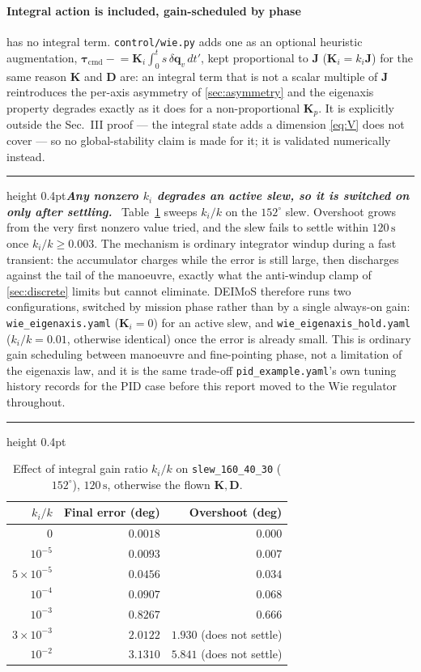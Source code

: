 \documentclass[conference,10pt,a4paper]{IEEEtran}
\newcommand{\remarkrule}{\par\nobreak\vspace{2pt}%
  \hrule height 0.4pt\vspace{4pt}\nobreak}
\newenvironment{keybox}[1][Result]
  {\par\medskip\remarkrule\noindent\small\textbf{\textit{#1.}}\ \ignorespaces}
  {\par\vspace{3pt}\hrule height 0.4pt\par\medskip\ignorespacesafterend}
\newcommand{\vect}[1]{\bm{#1}}
\newcommand{\mat}[1]{\bm{#1}}
\newcommand{\unit}[1]{\ensuremath{\,\mathrm{#1}}}
\begin{document}
\paragraph{Integral action is included, gain-scheduled by phase}
 has no integral term. \texttt{control/wie.py} adds one as an
optional heuristic augmentation,
$\vect{\tau}_\text{cmd}\mathrel{-}=\mat{K}_i\!\int_0^t s\,\delta\vect{q}_v\,dt'$,
kept proportional to $\mat{J}$ ($\mat{K}_i=k_i\mat{J}$) for the same reason
$\mat{K}$ and $\mat{D}$ are: an integral term that is not a scalar multiple of
$\mat{J}$ reintroduces the per-axis asymmetry of \cref{sec:asymmetry} and the
eigenaxis property degrades exactly as it does for a non-proportional
$\mat{K}_p$. It is explicitly outside the Sec.~III
proof --- the integral state adds a dimension \cref{eq:V} does not cover --- so
no global-stability claim is made for it; it is validated numerically instead.

\begin{keybox}[Any nonzero $k_i$ degrades an active slew, so it is switched on only after settling]
Table~\ref{tab:kisweep} sweeps $k_i/k$ on the $152^\circ$ slew. Overshoot grows
from the very first nonzero value tried, and the slew fails to settle within
$120\unit{s}$ once $k_i/k\ge0.003$. The mechanism is ordinary integrator
windup during a fast transient: the accumulator charges while the error is
still large, then discharges against the tail of the manoeuvre, exactly what
the anti-windup clamp of \cref{sec:discrete} limits but cannot eliminate.
DEIMoS therefore runs two configurations, switched by mission phase rather
than by a single always-on gain: \texttt{wie\_eigenaxis.yaml} ($\mat{K}_i=0$)
for an active slew, and \texttt{wie\_eigenaxis\_hold.yaml}
($k_i/k=0.01$, otherwise identical) once the error is already small. This is
ordinary gain scheduling between manoeuvre and fine-pointing phase, not a
limitation of the eigenaxis law, and it is the same trade-off
\texttt{pid\_example.yaml}'s own tuning history records for the PID case
before this report moved to the Wie regulator throughout.
\end{keybox}

\begin{table}[!t]
\centering
\caption{Effect of integral gain ratio $k_i/k$ on \texttt{slew\_160\_40\_30}
($152^\circ$), $120\unit{s}$, otherwise the flown $\mat{K},\mat{D}$.}
\label{tab:kisweep}
\footnotesize
\begin{tabular}{@{}rrr@{}}
\toprule
$k_i/k$ & Final error (deg) & Overshoot (deg) \\
\midrule
$0$      & $0.0018$ & $0.000$ \\
$10^{-5}$ & $0.0093$ & $0.007$ \\
$5\times10^{-5}$ & $0.0456$ & $0.034$ \\
$10^{-4}$ & $0.0907$ & $0.068$ \\
$10^{-3}$ & $0.8267$ & $0.666$ \\
$3\times10^{-3}$ & $2.0122$ & $1.930$ (does not settle) \\
$10^{-2}$ & $3.1310$ & $5.841$ (does not settle) \\
\bottomrule
\end{tabular}
\end{table}
\end{document}

